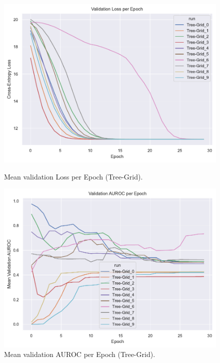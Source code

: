 \begin{figure}[htbp]
    \centering
    \begin{minipage}{0.48\textwidth}
        \centering
        \includegraphics[width=\textwidth]{img/plots/Grid_val_loss_plot.pdf}  %
        \caption{Mean validation Loss per Epoch (Tree-Grid).}
        \label{fig:Tree-Grid-val_loss}
    \end{minipage}
    \hfill
    \begin{minipage}{0.48\textwidth}
        \centering
        \includegraphics[width=\textwidth]{img/plots/Grid_val_auroc_plot.pdf}  %
        \caption{Mean validation AUROC per Epoch (Tree-Grid).}
        \label{fig:Tree-Grid-val_auroc}
    \end{minipage}
\end{figure}


